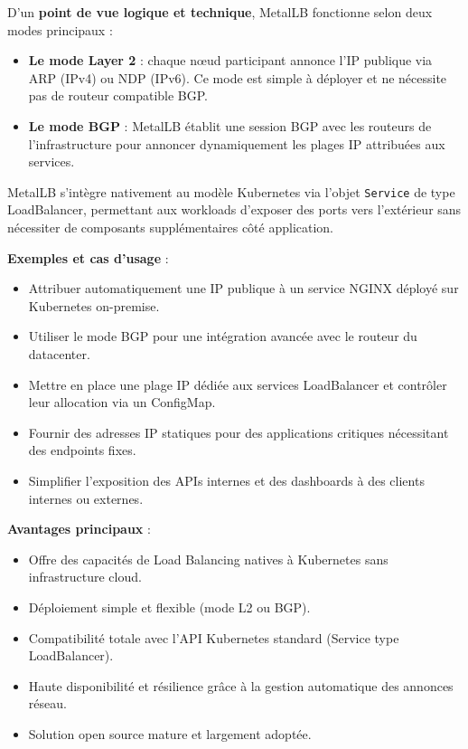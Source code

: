 D’un \textbf{point de vue logique et technique}, MetalLB fonctionne selon deux modes principaux :
\begin{itemize}
	\item \textbf{Le mode Layer 2}  : chaque nœud participant annonce l’IP publique via ARP (IPv4) ou NDP (IPv6). Ce mode est simple à déployer et ne nécessite pas de routeur compatible BGP.
	\item \textbf{Le mode BGP}  : MetalLB établit une session BGP avec les routeurs de l’infrastructure pour annoncer dynamiquement les plages IP attribuées aux services.
\end{itemize}

MetalLB s’intègre nativement au modèle Kubernetes via l’objet \texttt{Service} de type LoadBalancer, permettant aux workloads d’exposer des ports vers l’extérieur sans nécessiter de composants supplémentaires côté application.

\textbf{Exemples et cas d’usage} :
\begin{itemize}
	\item Attribuer automatiquement une IP publique à un service NGINX déployé sur Kubernetes on-premise.
	\item Utiliser le mode BGP pour une intégration avancée avec le routeur du datacenter.
	\item Mettre en place une plage IP dédiée aux services LoadBalancer et contrôler leur allocation via un ConfigMap.
	\item Fournir des adresses IP statiques pour des applications critiques nécessitant des endpoints fixes.
	\item Simplifier l’exposition des APIs internes et des dashboards à des clients internes ou externes.
\end{itemize}

\textbf{Avantages principaux} :
\begin{itemize}
	\item Offre des capacités de Load Balancing natives à Kubernetes sans infrastructure cloud.
	\item Déploiement simple et flexible (mode L2 ou BGP).
	\item Compatibilité totale avec l’API Kubernetes standard (Service type LoadBalancer).
	\item Haute disponibilité et résilience grâce à la gestion automatique des annonces réseau.
	\item Solution open source mature et largement adoptée.
\end{itemize}

